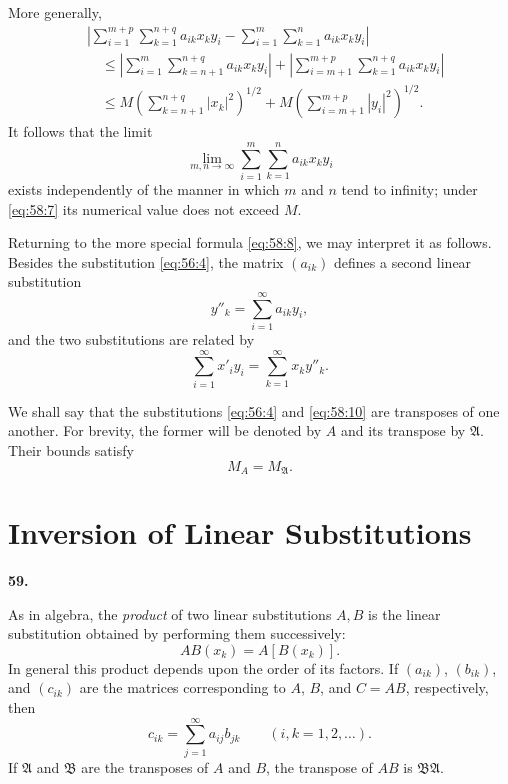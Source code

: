 \documentclass[
  paper=b5,
  fontsize=13pt,
  twoside=true,
  open=any,
  bookmarkpackage=false,
  chapterprefix=true,
  headings=normal
]{scrbook}
\theoremstyle{definition}
\newcommand{\numberedparagraph}[1]{%
  \par\medskip\phantomsection\label{sec:#1}%
  \noindent\textbf{#1.}\enspace
}
\begin{document}
More generally,
\begin{align*}
&\left|
 \sum_{i=1}^{m+p}\sum_{k=1}^{n+q}a_{ik}x_k y_i
 -\sum_{i=1}^{m}\sum_{k=1}^{n}a_{ik}x_k y_i
 \right|\\
&\quad\leq
 \left|\sum_{i=1}^{m}\sum_{k=n+1}^{n+q}a_{ik}x_k y_i\right|
 +\left|\sum_{i=m+1}^{m+p}\sum_{k=1}^{n+q}a_{ik}x_k y_i\right|\\
&\quad\leq M\left(\sum_{k=n+1}^{n+q}|x_k|^2\right)^{1/2}
 +M\left(\sum_{i=m+1}^{m+p}|y_i|^2\right)^{1/2}.
\end{align*}
It follows that the limit
\begin{equation}
  \lim_{m,n\to\infty}
  \sum_{i=1}^{m}\sum_{k=1}^{n}a_{ik}x_k y_i
  \tag{9}\label{eq:58:9}
\end{equation}
exists independently of the manner in which $m$ and $n$ tend to infinity;
under \eqref{eq:58:7} its numerical value does not exceed $M$.

Returning to the more special formula \eqref{eq:58:8}, we may interpret it
as follows. Besides the substitution \eqref{eq:56:4}, the matrix $(a_{ik})$
defines a second linear substitution
\begin{equation}
  y''_k=\sum_{i=1}^{\infty}a_{ik}y_i,
  \tag{10}\label{eq:58:10}
\end{equation}
and the two substitutions are related by
\begin{equation}
  \sum_{i=1}^{\infty}x'_i y_i
  =\sum_{k=1}^{\infty}x_k y''_k.
  \tag{11}\label{eq:58:11}
\end{equation}

We shall say that the substitutions \eqref{eq:56:4} and
\eqref{eq:58:10} are transposes of one another. For brevity, the former
will be denoted by $A$ and its transpose by $\mathfrak A$. Their bounds
satisfy
\[
  M_A=M_{\mathfrak A}.
\]

\section{Inversion of Linear Substitutions}\label{sec:inversion-linear-substitutions}

\numberedparagraph{59}
As in algebra, the \emph{product} of two linear substitutions $A,B$ is the
linear substitution obtained by performing them successively:
\[
  AB(x_k)=A[B(x_k)].
\]
In general this product depends upon the order of its factors. If
$(a_{ik})$, $(b_{ik})$, and $(c_{ik})$ are the matrices corresponding to
$A$, $B$, and $C=AB$, respectively, then
\[
  c_{ik}=\sum_{j=1}^{\infty}a_{ij}b_{jk}
  \qquad(i,k=1,2,\ldots).
\]
If $\mathfrak A$ and $\mathfrak B$ are the transposes of $A$ and $B$, the
transpose of $AB$ is $\mathfrak B\mathfrak A$.
\end{document}
